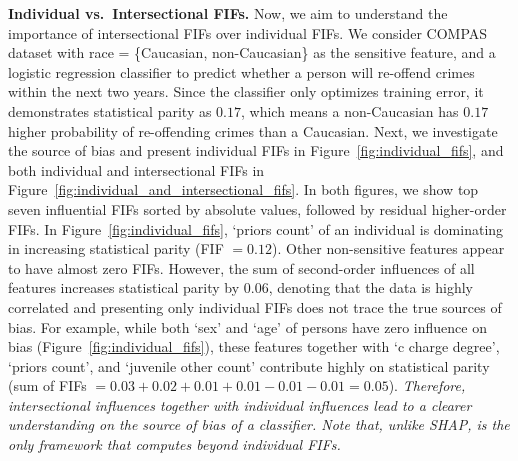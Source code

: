 \noindent\textbf{Individual vs.\ Intersectional FIFs.} Now, we aim to understand the importance of intersectional FIFs over individual FIFs. We consider COMPAS dataset with race = \{Caucasian, non-Caucasian\} as the sensitive feature, and a logistic regression classifier to predict whether a person will re-offend crimes within the next two years. Since the classifier only optimizes training error, it demonstrates statistical parity as $ 0.17 $, which means a non-Caucasian  has $ 0.17 $ higher probability of re-offending crimes than a Caucasian. Next, we investigate the source of bias and present individual FIFs in Figure~\ref{fig:individual_fifs}, and both individual and intersectional FIFs in Figure~\ref{fig:individual_and_intersectional_fifs}. In both figures, we show top seven influential FIFs sorted by absolute values,  followed by residual higher-order FIFs. In Figure~\ref{fig:individual_fifs}, `priors count' of an individual is dominating in increasing statistical parity (FIF $ = 0.12 $). Other non-sensitive features appear to have almost zero FIFs. However, the sum of second-order influences of all features increases statistical parity by $ 0.06 $, denoting that the data is highly correlated and presenting only individual FIFs does not trace the true sources of bias. For example, while both `sex' and `age' of persons have zero influence on bias (Figure~\ref{fig:individual_fifs}), these features together with `c charge degree', `priors count', and `juvenile other count' contribute highly on statistical parity (sum of FIFs $ = 0.03 + 0.02 + 0.01 + 0.01 - 0.01 - 0.01 = 0.05$). \emph{Therefore, intersectional influences together with individual influences lead to a clearer understanding on the source of bias of a classifier. Note that, unlike SHAP, {\fairXplainer} is the only framework that computes beyond individual FIFs.}
